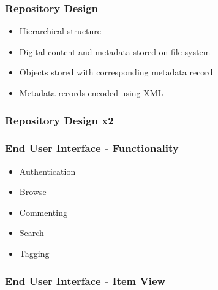 \documentclass[xcolor=dvitex,t,11pt]{beamer}
\begin{document}
\begin{frame}[fragile]
\frametitle{Repository Design}
\begin{figure}
\centering
\framebox[\textwidth]{%

}
\end{figure}
\begin{itemize}
\item Hierarchical structure
\item Digital content and metadata stored on file system
\item Objects stored with corresponding metadata record
\item Metadata records encoded using XML
\end{itemize}
\begin{figure}
\end{figure}
\end{frame}

\begin{frame}[fragile]
\frametitle{Repository Design x2}
\begin{figure}
\centering
\framebox[\textwidth]{%

}
\end{figure}
\end{frame}

\begin{frame}[fragile]
\frametitle{End User Interface - Functionality}
\begin{figure}
\centering
\framebox[\textwidth]{%

}
\end{figure}
\begin{itemize}
\item Authentication
\item Browse
\item Commenting
\item Search
\item Tagging
\end{itemize}
\end{frame}

\begin{frame}[fragile]
\frametitle{End User Interface - Item View}
\begin{figure}
\centering
{}
\end{figure}
\end{frame}
\end{document}
